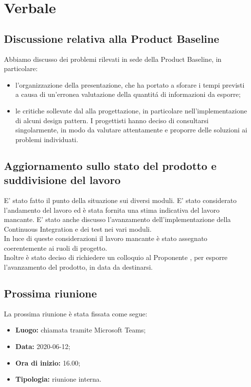 \section{Verbale}
\subsection{Discussione relativa alla Product Baseline}
	Abbiamo discusso dei problemi rilevati in sede della Product Baseline, in particolare:
	\begin{itemize}
		\item l'organizzazione della presentazione, che ha portato a sforare i tempi previsti a causa di un'erronea valutazione della quantitá di informazioni da esporre;
		\item le critiche sollevate dal \RC{} alla progettazione, in particolare nell'implementazione di alcuni design pattern. I progettisti hanno deciso di consultarsi singolarmente, in modo da valutare attentamente e proporre delle soluzioni ai problemi individuati.
	\end{itemize}
\subsection{Aggiornamento sullo stato del prodotto e suddivisione del lavoro}
E’ stato fatto il punto della situazione sui diversi moduli. E' stato considerato l’andamento del lavoro ed è stata fornita una stima indicativa del lavoro mancante. E’ stato anche discusso l'avanzamento dell'implementazione della Continuous Integration e dei test nei vari moduli.\\ In luce di queste considerazioni il lavoro mancante è stato assegnato coerentemente ai ruoli di progetto.\\ Inoltre è stato deciso di richiedere un colloquio al Proponente \Proponente{}, per esporre l'avanzamento del prodotto, in data da destinarsi.
	\subsection{Prossima riunione}
		La prossima riunione è stata fissata come segue:
		\begin{itemize}
			\item \textbf{Luogo:} chiamata tramite Microsoft Teams;
			\item \textbf{Data:} 2020-06-12;
			\item \textbf{Ora di inizio:} 16.00;
			\item \textbf{Tipologia:} riunione interna.
		\end{itemize}
